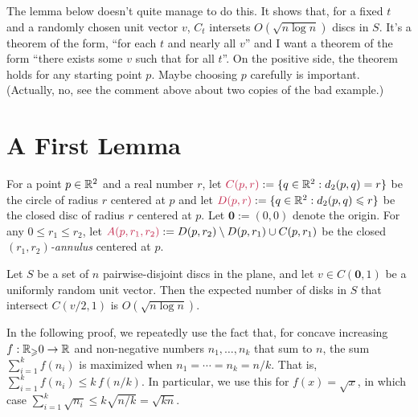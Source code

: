 \documentclass{patmorin}
\makeatletter
\renewcommand{\ge}{\geqslant}
\renewcommand{\le}{\leqslant}
\newcommand{\defin}[1]{\emph{\textcolor{brightmaroon}{#1}}}
\def\mathcolor#1#{\@mathcolor{#1}}
\def\@mathcolor#1#2#3{%
  \protect\leavevmode
  \begingroup
    \color#1{#2}#3%
  \endgroup
}
\newcommand{\mathdefin}[1]{\mathcolor{brightmaroon}{#1}}
\makeatother
\begin{document}
The lemma below doesn't quite manage to do this.  It shows that, for a fixed $t$ and a randomly chosen unit vector $v$, $C_t$ intersets $O(\sqrt{n\log n})$ discs in $S$.  It's a theorem of the form, ``for each $t$ and nearly all $v$'' and I want a theorem of the form ``there exists some $v$ such that for all $t$''.  On the positive side, the theorem holds for any starting point $p$.  Maybe choosing $p$ carefully is important.  (Actually, no, see the comment above about two copies of the bad example.)



\section{A First Lemma}

For a point $p\in\mathbb{R}^2$ and a real number $r$, let $\mathdefin{C(p,r)}:=\{q\in\R^2: d_2(p,q)=r\}$ be the circle of radius $r$ centered at $p$ and let $\mathdefin{D(p,r)}:=\{q\in\R^2: d_2(p,q)\le r\}$ be the closed disc of radius $r$ centered at $p$.  Let $\mathbf{0}:=(0,0)$ denote the origin.  For any $0\le r_1\le r_2$, let $\mathdefin{A(p,r_1,r_2)}:=D(p,r_2)\setminus D(p,r_1)\cup C(p,r_1)$ be the closed \defin{$(r_1,r_2)$-annulus} centered at $p$.

\begin{lem}
  Let $S$ be a set of $n$ pairwise-disjoint discs in the plane, and let $v\in C(\mathbf{0},1)$ be a uniformly random unit vector.  Then the expected number of disks in $S$ that intersect $C(v/2,1)$ is $O(\sqrt{n\log n})$.
\end{lem}

In the following proof, we repeatedly use the fact that, for concave increasing $f:\R_\ge 0\to\R$ and non-negative numbers $n_1,\ldots,n_k$ that sum to $n$, the sum $\sum_{i=1}^k f(n_i)$ is maximized when $n_1=\cdots=n_k=n/k$.  That is, $\sum_{i=1}^k f(n_i) \le k\,f(n/k)$.  In particular, we use this for $f(x)=\sqrt{x}$, in which case $\sum_{i=1}^k \sqrt{n_i}\le k\sqrt{n/k}=\sqrt{kn}$.
\end{document}
